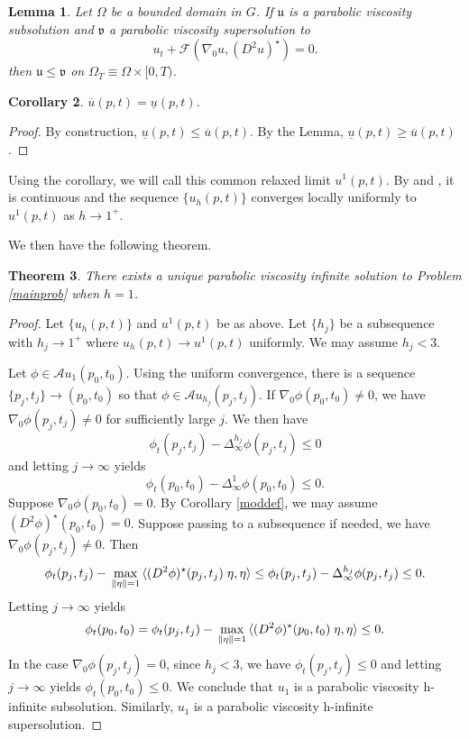 \documentclass[12pt]{amsart}
\newtheorem{thm}{Theorem}[section]
\newtheorem{corollary}[thm]{Corollary}
\newtheorem{lemma}[thm]{Lemma}
\theoremstyle{definition}
\theoremstyle{remark}
\numberwithin{equation}{section}
\begin{document}
\begin{lemma}
Let $\Omega$ be a bounded domain in $G$.   If $\mathfrak{u}$ is a parabolic viscosity subsolution and $\mathfrak{v}$ a parabolic viscosity supersolution to $$u_t+\mathcal{F}(\nabla_0 u,(D^2u)^{\star})=0.$$ then $\mathfrak{u} \leq \mathfrak{v}$ on $\Omega_T\equiv\Omega\times [0,T) $.
\end{lemma}
\begin{corollary}
$\overline{u}(p,t)=\underline{u}(p,t)$.
\end{corollary}
\begin{proof}
By construction, $\underline{u}(p,t)\leq \overline{u}(p,t)$. By the Lemma, $\underline{u}(p,t)\geq \overline{u}(p,t)$.
\end{proof}
Using the corollary, we will call this common relaxed limit $u^1(p,t)$. By \cite[Chapter 2]{Giga} and \cite[Section 6]{CIL:UGTVS}, it is continuous and the sequence $\{u_h(p,t)\}$ converges locally uniformly to $u^1(p,t)$ as $h\to 1^+$. 

We then have the following theorem.
\begin{thm}\label{oneexist}
There exists a unique parabolic viscosity infinite solution to Problem \ref{mainprob} when $h=1$. 
\end{thm}
\begin{proof}
Let $\{u_h(p,t)\}$ and $u^1(p,t)$ be as above. Let $\{h_j\}$ be a subsequence with $h_j\to 1^+$ where 
$u_h(p,t)\to u^1(p,t)$ uniformly. We may assume $h_j<3$. 

Let  $\phi\in\mathcal{A}u_1(p_0,t_0)$. Using the uniform convergence, there is a sequence $\{p_j,t_j\}\to (p_0,t_0)$ so that $\phi \in \mathcal{A}u_{h_j}(p_j,t_j)$. If $\nabla_0\phi(p_0,t_0)\neq 0$, we have  $\nabla_0\phi(p_j,t_j)\neq 0$ for sufficiently large $j$. 
We then have
$$\phi_t(p_j,t_j)-\Delta^{h_j}_\infty \phi(p_j,t_j) \leq 0$$ and letting $j\to\infty$ yields
$$\phi_t(p_0,t_0)-\Delta^1_\infty \phi(p_0,t_0) \leq 0.$$  
Suppose $\nabla_0\phi(p_0,t_0)=0$. By Corollary \ref{moddef}, we may assume $(D^2\phi)^\star(p_0,t_0)=0$.  Suppose passing to a subsequence if needed, we have  $\nabla_0\phi(p_j,t_j)\neq 0$.
Then 
\begin{equation*}
\phi_t(p_j,t_j)-{\displaystyle} \max_{\|\eta\|=1}{\ensuremath{\langle {(D^2\phi)^\star(p_j,t_j)\;\eta} , {\eta} \rangle}}  \leq 
\phi_t(p_j,t_j)-\Delta^{h_j}_\infty \phi(p_j,t_j) \leq 0.
\end{equation*}
Letting $j\to\infty$ yields
$$\phi_t(p_0,t_0)=\phi_t(p_j,t_j)-{\displaystyle} \max_{\|\eta\|=1}{\ensuremath{\langle {(D^2\phi)^\star(p_0,t_0)\;\eta} , {\eta} \rangle}}\leq 0.$$
In the case $\nabla_0\phi(p_j,t_j)= 0$, since $h_j<3$, we have $\phi_t(p_j,t_j) \leq 0$ and letting $j\to\infty$ yields $\phi_t(p_0,t_0)\leq 0$. We conclude that $u_1$ is a parabolic viscosity h-infinite subsolution. Similarly, 
$u_1$ is a parabolic viscosity h-infinite supersolution.
\end{proof}
\end{document}
